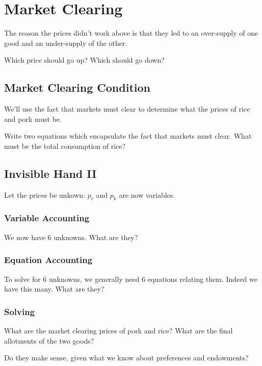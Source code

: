 \documentclass{article}
\begin{document}
\section{Market Clearing}

The reason the prices didn't work above is that they led to an over-supply of one good and an under-supply of the other. 

Which price should go up? Which should go down?

\subsection{Market Clearing Condition}

We'll use the fact that markets must clear to determine what the prices of rice and pork must be.

Write two equations which encapsulate the fact that markets must clear. What must be the total consumption of rice?

\subsection{Invisible Hand II} 

Let the prices be unkown: $p_r$ and $p_k$ are now variables.

\subsubsection{Variable Accounting}

We now have 6 unknowns. What are they?

\subsubsection{Equation Accounting}

To solve for 6 unknowns, we generally need 6 equations relating them. Indeed we have this many. What are they?

\subsubsection{Solving}

What are the market clearing prices of pork and rice? What are the final allotments of the two goods?

Do they make sense, given what we know about preferences and endowments?
\end{document}
